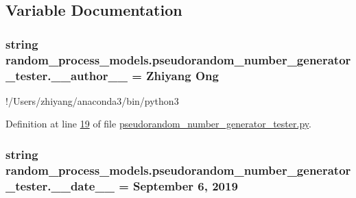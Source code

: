 \subsection{Variable Documentation}
\hypertarget{namespacerandom__process__models_1_1pseudorandom__number__generator__tester_a67279ea57e007a95e27af9f25cf84db6}{}
\subsubsection[{\+\_\+\+\_\+author\+\_\+\+\_\+}]{\setlength{\rightskip}{0pt plus 5cm}string random\+\_\+process\+\_\+models.\+pseudorandom\+\_\+number\+\_\+generator\+\_\+tester.\+\_\+\+\_\+author\+\_\+\+\_\+ = \textquotesingle{}Zhiyang Ong\textquotesingle{}}\label{namespacerandom__process__models_1_1pseudorandom__number__generator__tester_a67279ea57e007a95e27af9f25cf84db6}


!/\+Users/zhiyang/anaconda3/bin/python3 



Definition at line \hyperlink{pseudorandom__number__generator__tester_8py_source_l00019}{19} of file \hyperlink{pseudorandom__number__generator__tester_8py_source}{pseudorandom\+\_\+number\+\_\+generator\+\_\+tester.\+py}.

\hypertarget{namespacerandom__process__models_1_1pseudorandom__number__generator__tester_a8dbe9b20b965a3a680bcad127e27c55e}{}
\subsubsection[{\+\_\+\+\_\+date\+\_\+\+\_\+}]{\setlength{\rightskip}{0pt plus 5cm}string random\+\_\+process\+\_\+models.\+pseudorandom\+\_\+number\+\_\+generator\+\_\+tester.\+\_\+\+\_\+date\+\_\+\+\_\+ = \textquotesingle{}September 6, 2019\textquotesingle{}}\label{namespacerandom__process__models_1_1pseudorandom__number__generator__tester_a8dbe9b20b965a3a680bcad127e27c55e}


